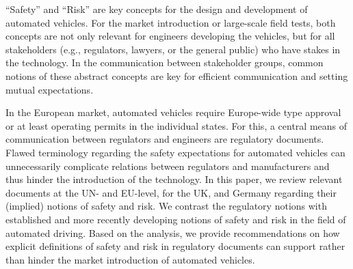 ``Safety'' and ``Risk'' are key concepts for the design and development of automated vehicles.
For the market introduction or large-scale field tests, both concepts are not only relevant for engineers developing the vehicles, but for all stakeholders (e.g., regulators, lawyers, or the general public) who have stakes in the technology.
In the communication between stakeholder groups, common notions of these abstract concepts are key for efficient communication and setting mutual expectations.

In the European market, automated vehicles require Europe-wide type approval or at least operating permits in the individual states.
For this, a central means of communication between regulators and engineers are regulatory documents.
Flawed terminology regarding the safety expectations for automated vehicles can unnecessarily complicate relations between regulators and manufacturers and thus hinder the introduction of the technology.
In this paper, we review relevant documents at the UN- and EU-level, for the UK, and Germany regarding their (implied) notions of safety and risk.
We contrast the regulatory notions with established and more recently developing notions of safety and risk in the field of automated driving.
Based on the analysis, we provide recommendations on how explicit definitions of safety and risk in regulatory documents can support rather than hinder the market introduction of automated vehicles.